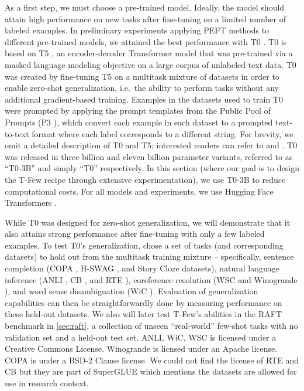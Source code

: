 \documentclass{article}
\newcommand{\tfew}{{\fontfamily{lmtt}\selectfont T-Few}\xspace}
\begin{document}
As a first step, we must choose a pre-trained model.
Ideally, the model should attain high performance on new tasks after fine-tuning on a limited number of labeled examples.
In preliminary experiments applying PEFT methods to different pre-trained models, we attained the best performance with T0 \cite{sanh2021multitask}.
T0 is based on T5 \citep{raffel2019exploring}, an encoder-decoder Transformer model \citep{vaswani2017attention} that was pre-trained via a masked language modeling objective \citep{devlin2018bert} on a large corpus of unlabeled text data.
T0 was created by fine-tuning T5 on a multitask mixture of datasets in order to enable zero-shot generalization, i.e.\ the ability to perform tasks without any additional gradient-based training.
Examples in the datasets used to train T0 were prompted by applying the prompt templates from the Public Pool of Prompts (P3 \citep{bach2022promptsource}), which convert each example in each dataset to a prompted text-to-text format where each label corresponds to a different string.
For brevity, we omit a detailed description of T0 and T5; interested readers can refer to \citet{sanh2021multitask} and \citet{raffel2019exploring}.
T0 was released in three billion and eleven billion parameter variants, referred to as ``T0-3B'' and simply ``T0'' respectively.
In this section (where our goal is to design the \tfew recipe through extensive experimentation), we use T0-3B to reduce computational costs.
For all models and experiments, we use Hugging Face Transformers \citep{wolf2020transformers}.

While T0 was designed for zero-shot generalization, we will demonstrate that it also attains strong performance after fine-tuning with only a few labeled examples.
To test T0's generalization, \citet{sanh2021multitask} chose a set of tasks (and corresponding datasets) to hold out from the multitask training mixture -- specifically, sentence completion (COPA \citep{copa}, H-SWAG \citep{zellers2019hellaswag}, and Story Cloze \citep{sharma2018tackling} datasets), natural language inference (ANLI \citep{nie2019adversarial}, CB \citep{cb}, and RTE \citep{dagan2005pascal}), coreference resolution (WSC \citep{wsc} and Winogrande \citep{sakaguchi2020winogrande}), and word sense disambiguation (WiC \citep{pilehvar2018wic}).
Evaluation of generalization capabilities can then be straightforwardly done by measuring performance on these held-out datasets.
We also will later test \tfew's abilities in the RAFT benchmark \citep{alex2021raft} in \cref{sec:raft}, a collection of unseen ``real-world'' few-shot tasks with no validation set and a held-out test set. 
ANLI, WiC, WSC is licensed under a Creative Commons License. Winogrande is licnsed under an Apache license.  COPA is under a BSD-2 Clause license. We could not find the license of RTE and CB but they are part of SuperGLUE which mentions the datasets are allowed for use in research context.
\end{document}
